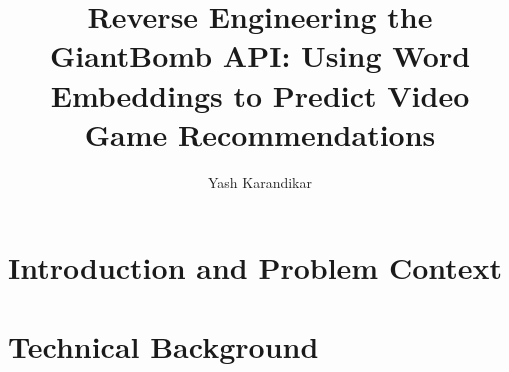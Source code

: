 \documentclass[10pt,twocolumn]{article}
\title{Reverse Engineering the GiantBomb API: Using Word Embeddings to Predict Video Game Recommendations}
\author{Yash Karandikar}
\affiliation{Occidental College}
\begin{document}
\maketitle

\section{Introduction and Problem Context}


\begin{comment}
    Why the project is interesting.
    To me:
        - want to gain experience in ML, particularly in setting up a real-world problem (as opposed to problems specifically engineered for textbooks)
        - video games are one of my hobbies, and I have seen the various ways sources of video game-related text can arise (reviews, descriptions, forums, etc.) - use NLP to inform ML model
    To general public:
        - recommender systems are prevalent in today's highly technological society. (Buying things on Amazon, watching content on Netflix, connecting with people on Facebook, professional development on LinkedIn, etc. - all use recommendation systems)
        - supervised learning is becoming part of recommender system infrastructure (particularly for content-based, rather than collaborative filtering-based, aspects)

    Difficulty of project:
    - ML - deciding, obtaining, and preprocessing data in an ethical, efficient way. This is good practice for the real world
    - iterative ML algorithm improvement - how to identify breakpoints and be skeptical of results, then make iterative changes to algorithm to fix results
\end{comment}

\section{Technical Background}

\end{document}
